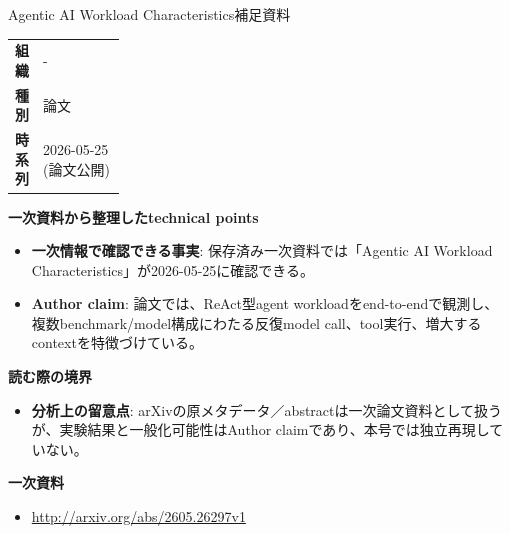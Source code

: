 \begin{technicalnote}{Agentic AI Workload Characteristics}{補足資料}
\begingroup
\begin{tabularx}{\linewidth}{@{}>{\bfseries}p{0.22\linewidth}X@{}}
組織 & - \\
種別 & 論文 \\
時系列 & 2026-05-25 (論文公開) \\
\end{tabularx}
\smallskip
{\bfseries 一次資料から整理したtechnical points}
\begin{itemize}[leftmargin=1.5em,itemsep=0.35em]
\item \textbf{一次情報で確認できる事実}: 保存済み一次資料では「Agentic AI Workload Characteristics」が2026-05-25に確認できる。
\end{itemize}
\begin{minipage}{\linewidth}
\begin{itemize}[leftmargin=1.5em,itemsep=0.35em]
\item \textbf{Author claim}: 論文では、ReAct型agent workloadをend-to-endで観測し、複数benchmark/model構成にわたる反復model call、tool実行、増大するcontextを特徴づけている。
\end{itemize}
{\bfseries 読む際の境界}
\begin{itemize}[leftmargin=1.5em,itemsep=0.35em]
\item \textbf{分析上の留意点}: arXivの原メタデータ／abstractは一次論文資料として扱うが、実験結果と一般化可能性はAuthor claimであり、本号では独立再現していない。
\end{itemize}
\begin{samepage}
{\bfseries 一次資料}
\begingroup\sloppy
\begin{itemize}[leftmargin=1.5em,itemsep=0.25em]
\item {\scriptsize\url{http://arxiv.org/abs/2605.26297v1}}
\end{itemize}
\endgroup
\end{samepage}
\end{minipage}
\endgroup
\end{technicalnote}
\medskip
